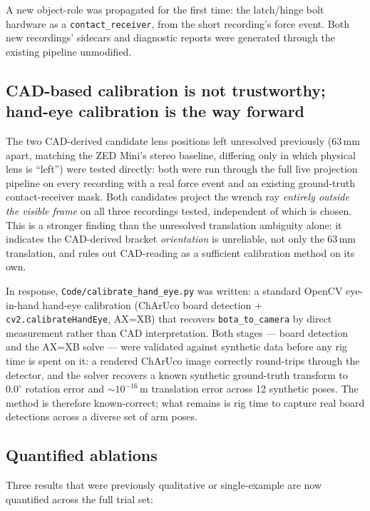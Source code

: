 \documentclass[11pt]{article}
\begin{document}
A new object-role was propagated for the first time: the latch/hinge bolt
hardware as a \texttt{contact\_receiver}, from the short recording's force
event. Both new recordings' sidecars and diagnostic reports were generated
through the existing pipeline unmodified.

\subsection{CAD-based calibration is not trustworthy; hand-eye calibration is the way forward}

The two CAD-derived candidate lens positions left unresolved previously
(63\,mm apart, matching the ZED Mini's stereo baseline, differing only in
which physical lens is ``left'') were tested directly: both were run
through the full live projection pipeline on every recording with a real
force event and an existing ground-truth contact-receiver mask. Both
candidates project the wrench ray \emph{entirely outside the visible
frame} on all three recordings tested, independent of which is chosen.
This is a stronger finding than the unresolved translation ambiguity
alone: it indicates the CAD-derived bracket \emph{orientation} is
unreliable, not only the 63\,mm translation, and rules out CAD-reading as
a sufficient calibration method on its own.

In response, \texttt{Code/calibrate\_hand\_eye.py} was written: a standard
OpenCV eye-in-hand hand-eye calibration (ChArUco board detection +
\texttt{cv2.calibrateHandEye}, AX=XB) that recovers \texttt{bota\_to\_camera}
by direct measurement rather than CAD interpretation. Both stages --- board
detection and the AX=XB solve --- were validated against synthetic data
before any rig time is spent on it: a rendered ChArUco image correctly
round-trips through the detector, and the solver recovers a known
synthetic ground-truth transform to $0.0^\circ$ rotation error and
$\sim 10^{-16}$\,m translation error across 12 synthetic poses. The method
is therefore known-correct; what remains is rig time to capture real board
detections across a diverse set of arm poses.

\subsection{Quantified ablations}

Three results that were previously qualitative or single-example are now
quantified across the full trial set:
\end{document}
